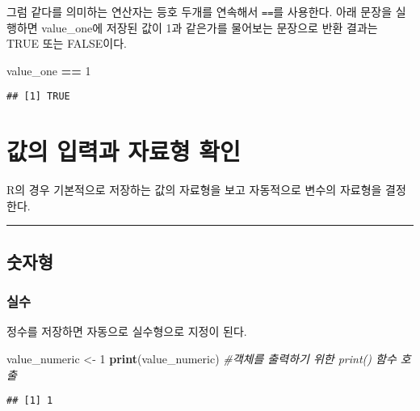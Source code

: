 \documentclass[
]{article}
\newenvironment{Shaded}{\begin{snugshade}}{\end{snugshade}}
\newcommand{\CommentTok}[1]{\textcolor[rgb]{0.56,0.35,0.01}{\textit{#1}}}
\newcommand{\DecValTok}[1]{\textcolor[rgb]{0.00,0.00,0.81}{#1}}
\newcommand{\FunctionTok}[1]{\textcolor[rgb]{0.13,0.29,0.53}{\textbf{#1}}}
\newcommand{\NormalTok}[1]{#1}
\newcommand{\OtherTok}[1]{\textcolor[rgb]{0.56,0.35,0.01}{#1}}
\newcommand{\SpecialCharTok}[1]{\textcolor[rgb]{0.81,0.36,0.00}{\textbf{#1}}}
\begin{document}
그럼 같다를 의미하는 연산자는 등호 두개를 연속해서 \texttt{==}를
사용한다. 아래 문장을 실행하면 value\_one에 저장된 값이 1과 같은가를
물어보는 문장으로 반환 결과는 TRUE 또는 FALSE이다.

\begin{Shaded}
\begin{Highlighting}[]
\NormalTok{value\_one }\SpecialCharTok{==} \DecValTok{1}
\end{Highlighting}
\end{Shaded}

\begin{verbatim}
## [1] TRUE
\end{verbatim}

\hypertarget{uxac12uxc758-uxc785uxb825uxacfc-uxc790uxb8ccuxd615-uxd655uxc778}{%
\section{값의 입력과 자료형
확인}\label{uxac12uxc758-uxc785uxb825uxacfc-uxc790uxb8ccuxd615-uxd655uxc778}}

R의 경우 기본적으로 저장하는 값의 자료형을 보고 자동적으로 변수의
자료형을 결정한다.

\begin{center}\rule{0.5\linewidth}{0.5pt}\end{center}

\hypertarget{uxc22buxc790uxd615}{%
\subsection{숫자형}\label{uxc22buxc790uxd615}}

\hypertarget{uxc2e4uxc218}{%
\subsubsection{실수}\label{uxc2e4uxc218}}

정수를 저장하면 자동으로 실수형으로 지정이 된다.

\begin{Shaded}
\begin{Highlighting}[]
\NormalTok{value\_numeric }\OtherTok{\textless{}{-}} \DecValTok{1}
\FunctionTok{print}\NormalTok{(value\_numeric) }\CommentTok{\#객체를 출력하기 위한 print() 함수 호출}
\end{Highlighting}
\end{Shaded}

\begin{verbatim}
## [1] 1
\end{verbatim}
\end{document}
